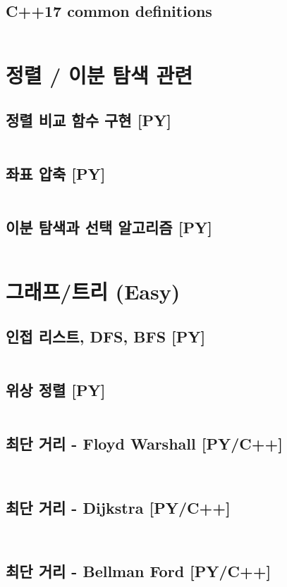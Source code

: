 \documentclass[landscape,8pt,a4paper,twocolumn]{extarticle}
\begin{document}
\tableofcontents
\subsection*{C++17 common definitions}
\inputminted{cpp}{mixed/cpp/common.hpp}
\section{정렬 / 이분 탐색 관련}
\subsection{정렬 비교 함수 구현 [PY]}
\inputminted{python}{python/Sorting/Compare.py}
\subsection{좌표 압축 [PY]}
\inputminted{python}{python/Sorting/CoordCompress.py}
\subsection{이분 탐색과 선택 알고리즘 [PY]}
\inputminted{python}{python/Sorting/STL.py}
\section{그래프/트리 (Easy)}
\subsection{인접 리스트, DFS, BFS [PY]}
\inputminted{python}{python/Graph1/DFSBFS.py}
\subsection{위상 정렬 [PY]}
\inputminted{python}{python/Graph1/TopSort.py}
\subsection{최단 거리 - Floyd Warshall [PY/C++]}
\inputminted{python}{python/Graph1/Floyd.py}
\inputminted{cpp}{mixed/cpp/Graph1/Floyd.hpp}
\subsection{최단 거리 - Dijkstra [PY/C++]}
\inputminted{python}{python/Graph1/Dijkstra.py}
\inputminted{cpp}{mixed/cpp/Graph1/Dijkstra.hpp}
\subsection{최단 거리 - Bellman Ford [PY/C++]}
\inputminted{python}{python/Graph1/Bellman.py}
\inputminted{cpp}{mixed/cpp/Graph1/Bellman.hpp}
\end{document}
